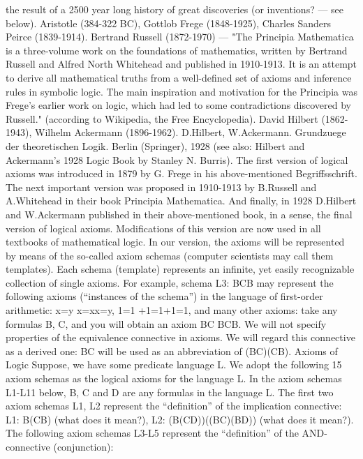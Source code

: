 the result of a 2500 year long history of great discoveries (or inventions? --- see below).
Aristotle (384-322 BC), Gottlob Frege (1848-1925), Charles Sanders Peirce (1839-1914).
Bertrand Russell (1872-1970) --- "The Principia Mathematica is a three-volume work on the foundations of mathematics,
written by Bertrand Russell and Alfred North Whitehead and published in 1910-1913. It is an attempt to derive all
mathematical truths from a well-defined set of axioms and inference rules in symbolic logic. The main inspiration and
motivation for the Principia was Frege's earlier work on logic, which had led to some contradictions discovered by Russell."
(according to Wikipedia, the Free Encyclopedia).
David Hilbert (1862-1943), Wilhelm Ackermann (1896-1962).
D.Hilbert, W.Ackermann. Grundzuege der theoretischen Logik. Berlin (Springer), 1928 (see also: Hilbert and Ackermann's
1928 Logic Book by Stanley N. Burris).
The first version of logical axioms was introduced in 1879 by G. Frege in his above-mentioned
Begriffsschrift. The next important version was proposed in 1910-1913 by B.Russell and A.Whitehead in
their book Principia Mathematica. And finally, in 1928 D.Hilbert and W.Ackermann published in their
above-mentioned book, in a sense, the final version of logical axioms. Modifications of this version are
now used in all textbooks of mathematical logic.
In our version, the axioms will be represented by means of the so-called axiom schemas (computer
scientists may call them templates). Each schema (template) represents an infinite, yet easily recognizable
collection of single axioms. For example, schema L3: B\AND C\IMPLIES B may represent the following axioms
(``instances of the schema'') in the language of first-order arithmetic:
x=y \AND  x=x\IMPLIES x=y,
1=1 +1=1+1=1,
and many other axioms: take any formulas B, C, and you will obtain an axiom B\AND C B\AND C\IMPLIES B.
We will not specify properties of the equivalence connective in axioms. We will regard this connective as
a derived one: B\IFF C will be used as an abbreviation of (B\IMPLIES C)\AND (C\IMPLIES B).
Axioms of Logic
Suppose, we have some predicate language L. We adopt the following 15 axiom schemas as the logical
axioms for the language L.
In the axiom schemas L1-L11 below, B, C and D are any formulas in the language L.
The first two axiom schemas L1, L2 represent the ``definition'' of the implication connective:
L1: B\IMPLIES (C\IMPLIES B) (what does it mean?),
L2: (B\IMPLIES (C\IMPLIES D))\IMPLIES ((B\IMPLIES C)\IMPLIES (B\IMPLIES D)) (what does it mean?).
The following axiom schemas L3-L5 represent the ``definition'' of the AND-connective (conjunction):
